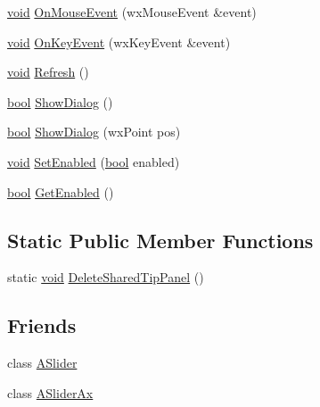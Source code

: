 \begin{DoxyCompactItemize}
\item 
\hyperlink{sound_8c_ae35f5844602719cf66324f4de2a658b3}{void} \hyperlink{class_l_w_slider_a5a81b56bf180901eb33b1c1e99aa0474}{On\+Mouse\+Event} (wx\+Mouse\+Event \&event)
\item 
\hyperlink{sound_8c_ae35f5844602719cf66324f4de2a658b3}{void} \hyperlink{class_l_w_slider_ac37c9a6f236c836eb817e47452f64f9d}{On\+Key\+Event} (wx\+Key\+Event \&event)
\item 
\hyperlink{sound_8c_ae35f5844602719cf66324f4de2a658b3}{void} \hyperlink{class_l_w_slider_a59726fb91dc91e634789bd39537b5c9c}{Refresh} ()
\item 
\hyperlink{mac_2config_2i386_2lib-src_2libsoxr_2soxr-config_8h_abb452686968e48b67397da5f97445f5b}{bool} \hyperlink{class_l_w_slider_ac1701671dece377fe31aace5baf6ce08}{Show\+Dialog} ()
\item 
\hyperlink{mac_2config_2i386_2lib-src_2libsoxr_2soxr-config_8h_abb452686968e48b67397da5f97445f5b}{bool} \hyperlink{class_l_w_slider_a5e48497b74ca5a36e283315c32588905}{Show\+Dialog} (wx\+Point pos)
\item 
\hyperlink{sound_8c_ae35f5844602719cf66324f4de2a658b3}{void} \hyperlink{class_l_w_slider_a35ce52f18f145cfc625adfe284b5a695}{Set\+Enabled} (\hyperlink{mac_2config_2i386_2lib-src_2libsoxr_2soxr-config_8h_abb452686968e48b67397da5f97445f5b}{bool} enabled)
\item 
\hyperlink{mac_2config_2i386_2lib-src_2libsoxr_2soxr-config_8h_abb452686968e48b67397da5f97445f5b}{bool} \hyperlink{class_l_w_slider_a421e44ee3d844809302967b7b44e3018}{Get\+Enabled} ()
\end{DoxyCompactItemize}
\subsection*{Static Public Member Functions}
\begin{DoxyCompactItemize}
\item 
static \hyperlink{sound_8c_ae35f5844602719cf66324f4de2a658b3}{void} \hyperlink{class_l_w_slider_a92e1e18d5b9cc8a68aafdb0ee4d92a8f}{Delete\+Shared\+Tip\+Panel} ()
\end{DoxyCompactItemize}
\subsection*{Friends}
\begin{DoxyCompactItemize}
\item 
class \hyperlink{class_l_w_slider_af3b62ca00f2af4e8608736004529cf2c}{A\+Slider}
\item 
class \hyperlink{class_l_w_slider_a2167247864d69763e5d637b4d62ccd88}{A\+Slider\+Ax}
\end{DoxyCompactItemize}


